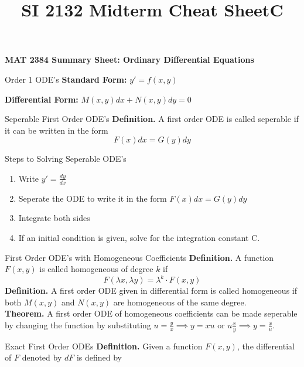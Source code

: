\documentclass{article}
\title{SI 2132 Midterm Cheat SheetC}
\begin{document}
\begin{center}{\large{\textbf{MAT 2384 Summary Sheet: Ordinary Differential Equations}}}\\
\end{center}




\begin{multicols*}{3}
\begin{blackbox}{Order 1 ODE's}
    \textbf{Standard Form:} $y' = f(x,y)$

    \textbf{Differential Form:} $M(x,y)dx + N(x,y)dy = 0$
    \begin{bluebox}{Seperable First Order ODE's}
        \textbf{Definition.} A first order ODE is called seperable if it can be written in the form \\[-2ex]
        \[F(x)dx = G(y)dy\]
        \begin{redbox}{Steps to Solving Seperable ODE's}
            \begin{enumerate}[align=left]
                \item Write $y' = \frac{dy}{dx}$
                \item Seperate the ODE to write it in the form $F(x)dx = G(y)dy$
                \item Integrate both sides
                \item If an initial condition is given, solve for the integration constant C. 
            \end{enumerate}
        \end{redbox}
    \end{bluebox}
    \begin{brownbox}{First Order ODE's with Homogeneous Coefficients}
        \textbf{Definition.} A function $F(x,y)$ is called homogeneous of degree $k$ if \\[-2ex]
        \[F(\lambda x, \lambda y) = \lambda^k \cdot F(x,y)\]
        \textbf{Definition.} A first order ODE given in differential form is called homogeneous if both $M(x,y)$ and $N(x,y)$ are homogeneous of the same degree.\\[1ex]
        \textbf{Theorem.} A first order ODE of homogeneous coefficients can be made seperable by changing the function by substituting $u = \frac{y}{x} \implies y = xu$ or $u \frac{x}{y} \implies y = \frac{x}{u}$. 
    \end{brownbox}
    \begin{bluebox}{Exact First Order ODEs}
        \textbf{Definition.} Given a function $F(x,y)$, the differential of $F$ denoted by $dF$ is defined by

\end{bluebox}
\end{blackbox}
\end{multicols*}
\end{document}
